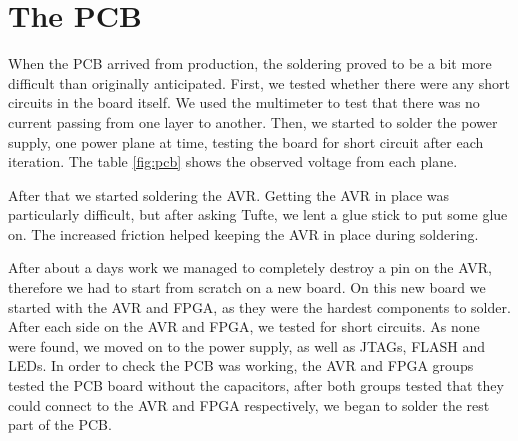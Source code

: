 \section {The PCB}



When the PCB arrived from production, the soldering proved
to be a bit more difficult than originally anticipated.
First, we tested whether
there were any short circuits in the board itself. We used the multimeter to test that
there was no current passing from one layer to another. Then, we started to solder the power supply, one power plane at time, testing the board for short
circuit after each iteration. The table \ref{fig:pcb} shows the observed voltage from each plane.



After that we started soldering the AVR. Getting the AVR in place was particularly difficult,
but after asking Tufte, we lent a glue stick to put some glue on. The increased friction helped keeping the AVR in place during soldering.

After about a days work we managed to completely destroy a pin on the AVR,
therefore we had to start from scratch on a new board. On this new board we
started with the AVR and FPGA, as they were the hardest components to
solder. After each side on the AVR and FPGA, we tested for short circuits. As
none were found, we moved on to the power supply, as well as JTAGs, FLASH and
LEDs. In order to check the PCB was working, the AVR and FPGA groups tested the
PCB board without the capacitors, after both groups tested that they could
connect to the AVR and FPGA respectively, we began to solder the rest part of
the PCB.


